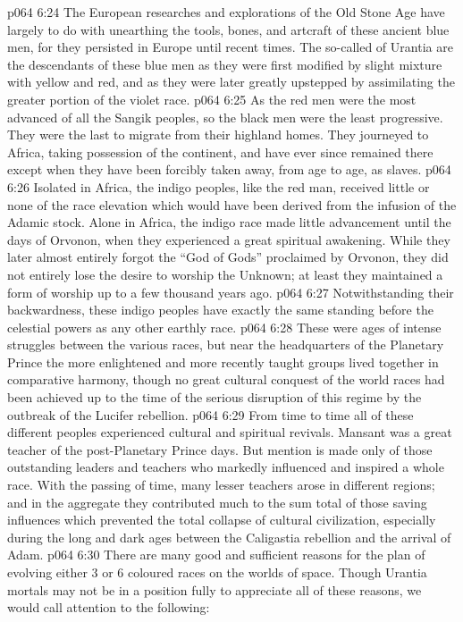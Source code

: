 \vs p064 6:24 The European researches and explorations of the Old Stone Age have largely to do with unearthing the tools, bones, and artcraft of these ancient blue men, for they persisted in Europe until recent times. The so\hyp{}called  of Urantia are the descendants of these blue men as they were first modified by slight mixture with yellow and red, and as they were later greatly upstepped by assimilating the greater portion of the violet race.
\vs p064 6:25 \bibnobreakspace {} As the red men were the most advanced of all the Sangik peoples, so the black men were the least progressive. They were the last to migrate from their highland homes. They journeyed to Africa, taking possession of the continent, and have ever since remained there except when they have been forcibly taken away, from age to age, as slaves.
\vs p064 6:26 Isolated in Africa, the indigo peoples, like the red man, received little or none of the race elevation which would have been derived from the infusion of the Adamic stock. Alone in Africa, the indigo race made little advancement until the days of Orvonon, when they experienced a great spiritual awakening. While they later almost entirely forgot the “God of Gods” proclaimed by Orvonon, they did not entirely lose the desire to worship the Unknown; at least they maintained a form of worship up to a few thousand years ago.
\vs p064 6:27 Notwithstanding their backwardness, these indigo peoples have exactly the same standing before the celestial powers as any other earthly race.
\vs p064 6:28 \pc These were ages of intense struggles between the various races, but near the headquarters of the Planetary Prince the more enlightened and more recently taught groups lived together in comparative harmony, though no great cultural conquest of the world races had been achieved up to the time of the serious disruption of this regime by the outbreak of the Lucifer rebellion.
\vs p064 6:29 \pc From time to time all of these different peoples experienced cultural and spiritual revivals. Mansant was a great teacher of the post\hyp{}Planetary Prince days. But mention is made only of those outstanding leaders and teachers who markedly influenced and inspired a whole race. With the passing of time, many lesser teachers arose in different regions; and in the aggregate they contributed much to the sum total of those saving influences which prevented the total collapse of cultural civilization, especially during the long and dark ages between the Caligastia rebellion and the arrival of Adam.
\vs p064 6:30 \pc There are many good and sufficient reasons for the plan of evolving either 3 or 6 coloured races on the worlds of space. Though Urantia mortals may not be in a position fully to appreciate all of these reasons, we would call attention to the following:
